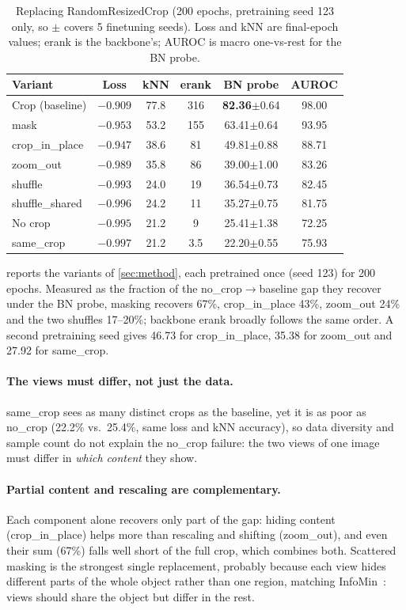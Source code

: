 \documentclass[10pt,twocolumn,letterpaper]{article}
\newcommand{\pmstd}[1]{{\scriptsize$\pm$#1}}
\begin{document}
\begin{table}[t]
\centering
\small
\setlength\tabcolsep{2.2pt}
\begin{tabular}{lccccc}
\toprule
Variant & Loss & kNN & erank & BN probe & AUROC \\
\midrule
Crop (baseline) & $-0.909$ & 77.8 & 316 & \textbf{82.36}\pmstd{0.64} & 98.00 \\
mask & $-0.953$ & 53.2 & 155 & 63.41\pmstd{0.64} & 93.95 \\
crop\_in\_place & $-0.947$ & 38.6 & 81 & 49.81\pmstd{0.88} & 88.71 \\
zoom\_out & $-0.989$ & 35.8 & 86 & 39.00\pmstd{1.00} & 83.26 \\
shuffle & $-0.993$ & 24.0 & 19 & 36.54\pmstd{0.73} & 82.45 \\
shuffle\_shared & $-0.996$ & 24.2 & 11 & 35.27\pmstd{0.75} & 81.75 \\
No crop & $-0.995$ & 21.2 & 9 & 25.41\pmstd{1.38} & 72.25 \\
same\_crop & $-0.997$ & 21.2 & 3.5 & 22.20\pmstd{0.55} & 75.93 \\
\bottomrule
\end{tabular}
\caption{Replacing RandomResizedCrop (200 epochs, pretraining seed 123 only, so $\pm$ covers 5 finetuning seeds). Loss and kNN are final-epoch values; erank is the backbone's; AUROC is macro one-vs-rest for the BN probe.}
\label{tab:crop}
\end{table}

 reports the variants of \cref{sec:method}, each pretrained once (seed 123) for 200 epochs.
Measured as the fraction of the no\_crop$\to$baseline gap they recover under the BN probe, masking recovers 67\%, crop\_in\_place 43\%, zoom\_out 24\% and the two shuffles 17--20\%; backbone erank broadly follows the same order.
A second pretraining seed gives 46.73 for crop\_in\_place, 35.38 for zoom\_out and 27.92 for same\_crop.

\paragraph{The views must differ, not just the data.}
same\_crop sees as many distinct crops as the baseline, yet it is as poor as no\_crop (22.2\% vs.\ 25.4\%, same loss and kNN accuracy), so data diversity and sample count do not explain the no\_crop failure: the two views of one image must differ in \emph{which content} they show.

\paragraph{Partial content and rescaling are complementary.}
Each component alone recovers only part of the gap: hiding content (crop\_in\_place) helps more than rescaling and shifting (zoom\_out), and even their sum (67\%) falls well short of the full crop, which combines both.
Scattered masking is the strongest single replacement, probably because each view hides different parts of the whole object rather than one region, matching InfoMin~\cite{tian2020infomin}: views should share the object but differ in the rest.
\end{document}
